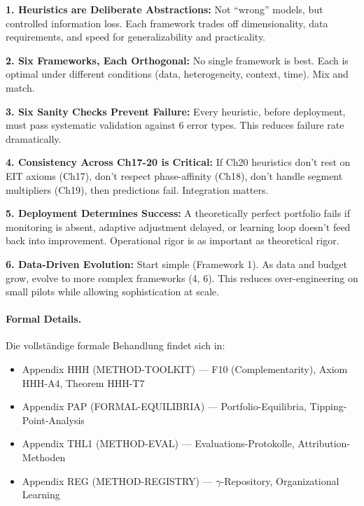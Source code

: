 \begin{tcolorbox}[colback=green!15!white, colframe=green!85!black, title=\textbf{Ch20 Core Insights}]

\textbf{1. Heuristics are Deliberate Abstractions:} Not ``wrong'' models, but controlled information loss. Each framework trades off dimensionality, data requirements, and speed for generalizability and practicality.

\textbf{2. Six Frameworks, Each Orthogonal:} No single framework is best. Each is optimal under different conditions (data, heterogeneity, context, time). Mix and match.

\textbf{3. Six Sanity Checks Prevent Failure:} Every heuristic, before deployment, must pass systematic validation against 6 error types. This reduces failure rate dramatically.

\textbf{4. Consistency Across Ch17-20 is Critical:} If Ch20 heuristics don't rest on EIT axioms (Ch17), don't respect phase-affinity (Ch18), don't handle segment multipliers (Ch19), then predictions fail. Integration matters.

\textbf{5. Deployment Determines Success:} A theoretically perfect portfolio fails if monitoring is absent, adaptive adjustment delayed, or learning loop doesn't feed back into improvement. Operational rigor is as important as theoretical rigor.

\textbf{6. Data-Driven Evolution:} Start simple (Framework 1). As data and budget grow, evolve to more complex frameworks (4, 6). This reduces over-engineering on small pilots while allowing sophistication at scale.

\end{tcolorbox}

\paragraph{Formal Details.}
Die vollständige formale Behandlung findet sich in:
\begin{itemize}[nosep]
\item Appendix HHH (METHOD-TOOLKIT) --- F10 (Complementarity), Axiom HHH-A4, Theorem HHH-T7
\item Appendix PAP (FORMAL-EQUILIBRIA) --- Portfolio-Equilibria, Tipping-Point-Analysis
\item Appendix THL1 (METHOD-EVAL) --- Evaluations-Protokolle, Attribution-Methoden
\item Appendix REG (METHOD-REGISTRY) --- $\gamma$-Repository, Organizational Learning
\end{itemize}

